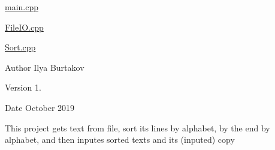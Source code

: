 
\begin{DoxyItemize}
\item \mbox{\hyperlink{main_8cpp}{main.\+cpp}}
\item \mbox{\hyperlink{_file_i_o_8cpp}{File\+I\+O.\+cpp}}
\item \mbox{\hyperlink{_sort_8cpp}{Sort.\+cpp}}
\end{DoxyItemize}

\begin{DoxyAuthor}{Author}
Ilya Burtakov 
\end{DoxyAuthor}
\begin{DoxyVersion}{Version}
1. 
\end{DoxyVersion}
\begin{DoxyDate}{Date}
October 2019
\end{DoxyDate}
This project gets text from file, sort its lines by alphabet, by the end by alphabet, and then inputes sorted texts and its (inputed) copy 
